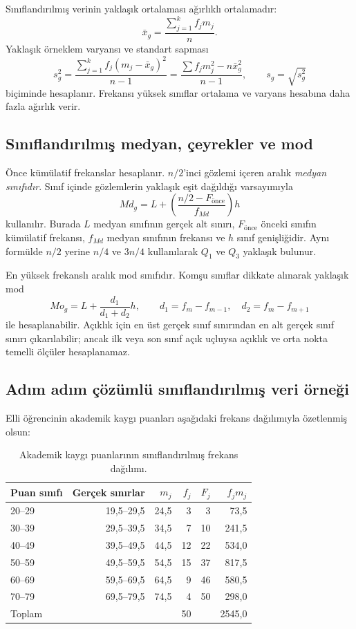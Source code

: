 Sınıflandırılmış verinin yaklaşık ortalaması ağırlıklı ortalamadır:
\[
\bar{x}_g=\frac{\sum_{j=1}^{k}f_jm_j}{n}.
\]
Yaklaşık örneklem varyansı ve standart sapması
\[
s_g^2=\frac{\sum_{j=1}^{k}f_j(m_j-\bar{x}_g)^2}{n-1}
=\frac{\sum f_jm_j^2-n\bar{x}_g^2}{n-1},
\qquad
s_g=\sqrt{s_g^2}
\]
biçiminde hesaplanır. Frekansı yüksek sınıflar ortalama ve varyans hesabına
daha fazla ağırlık verir.

\subsection{Sınıflandırılmış medyan, çeyrekler ve mod}

Önce kümülatif frekanslar hesaplanır. $n/2$'inci gözlemi içeren aralık
\emph{medyan sınıfıdır}. Sınıf içinde gözlemlerin yaklaşık eşit dağıldığı
varsayımıyla
\[
Md_g=L+\left(\frac{n/2-F_{\mathrm{önce}}}{f_{Md}}\right)h
\]
kullanılır. Burada $L$ medyan sınıfının gerçek alt sınırı,
$F_{\mathrm{önce}}$ önceki sınıfın kümülatif frekansı, $f_{Md}$ medyan
sınıfının frekansı ve $h$ sınıf genişliğidir. Aynı formülde $n/2$ yerine
$n/4$ ve $3n/4$ kullanılarak $Q_1$ ve $Q_3$ yaklaşık bulunur.

En yüksek frekanslı aralık mod sınıfıdır. Komşu sınıflar dikkate alınarak
yaklaşık mod
\[
Mo_g=L+\frac{d_1}{d_1+d_2}h,
\qquad
d_1=f_m-f_{m-1},\quad d_2=f_m-f_{m+1}
\]
ile hesaplanabilir. Açıklık için en üst gerçek sınıf sınırından en alt gerçek
sınıf sınırı çıkarılabilir; ancak ilk veya son sınıf açık uçluysa açıklık ve
orta nokta temelli ölçüler hesaplanamaz.

\subsection{Adım adım çözümlü sınıflandırılmış veri örneği}

Elli öğrencinin akademik kaygı puanları aşağıdaki frekans dağılımıyla
özetlenmiş olsun:

\begin{table}[htbp]
\centering
\caption{Akademik kaygı puanlarının sınıflandırılmış frekans dağılımı.}
\begin{tabular}{@{}lrrrrr@{}}
\toprule
Puan sınıfı & Gerçek sınırlar & $m_j$ & $f_j$ & $F_j$ & $f_jm_j$ \\
\midrule
20--29 & 19,5--29,5 & 24,5 & 3  & 3  & 73,5 \\
30--39 & 29,5--39,5 & 34,5 & 7  & 10 & 241,5 \\
40--49 & 39,5--49,5 & 44,5 & 12 & 22 & 534,0 \\
50--59 & 49,5--59,5 & 54,5 & 15 & 37 & 817,5 \\
60--69 & 59,5--69,5 & 64,5 & 9  & 46 & 580,5 \\
70--79 & 69,5--79,5 & 74,5 & 4  & 50 & 298,0 \\
\midrule
Toplam & & & 50 & & 2545,0 \\
\bottomrule
\end{tabular}
\end{table}

